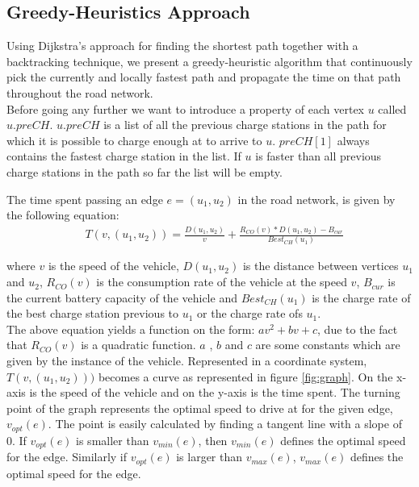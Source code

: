 \subsection{Greedy-Heuristics Approach}
Using Dijkstra's approach for finding the shortest path together with a backtracking technique, we present a 
greedy-heuristic algorithm that continuously pick the currently and locally fastest path and propagate the 
time on that path throughout the road network.\\

Before going any further we want to introduce a property of each vertex $u$ called $u.preCH$. $u.preCH$ 
is a list of all the previous charge stations in the path for which it is possible to charge enough at
to arrive to $u$. $preCH[1]$ always contains the fastest charge station in the list. If $u$ is faster 
than all previous charge stations in the path so far the list will be empty.      
 
The time spent passing an edge $e = (u_1, u_2)$ in the road network, is given by the following equation:
\begin{equation}
\begin{aligned}
 & T(v,(u_1, u_2)) = \frac{D(u_1, u_2)}{v} + \frac{R_{CO}(v) * D(u_1, u_2) - B_{cur}}{Best_{CH}(u_1)}
\end{aligned}
\end{equation}\label{eq:drivingAndCharging}

where $v$ is the speed of the vehicle, $D(u_1, u_2)$ is the distance between vertices $u_1$ and $u_2$,
$R_{CO}(v)$ is the consumption rate of the vehicle at the speed $v$, $B_{cur}$ is the current battery capacity of the vehicle 
and $Best_{CH}(u_1)$ is the charge rate of the best charge station previous to $u_1$ or the charge rate ofs $u_1$.\\

The above equation yields a function on the form: $av^2 + bv + c$, due to the fact that 
$R_{CO}(v)$ is a quadratic function. $a$ , $b$ and $c$ are some constants which are given by the instance of the vehicle. 
Represented in a coordinate system, $T(v,(u_1, u_2)))$ becomes a curve as represented in figure \ref{fig:graph}. On the x-axis is the speed of 
the vehicle and on the y-axis is the time spent. The turning point of the graph represents the optimal speed to drive at for the given edge, $v_{opt}(e)$. The point is easily calculated by finding a tangent line with a slope of 0. If $v_{opt}(e)$ is smaller than $v_{min}(e)$, then $v_{min}(e)$ defines the optimal speed for the edge. Similarly if $v_{opt}(e)$ is larger than $v_{max}(e)$, $v_{max}(e)$ defines the optimal speed for the edge.\\

